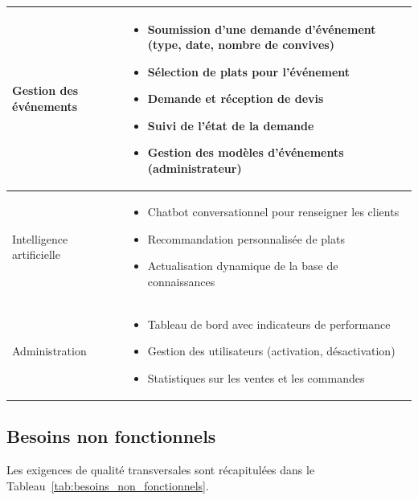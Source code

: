 \begin{longtable}{|p{3.5cm}|p{9cm}|}
    Gestion des événements &
    \begin{itemize}
        \item Soumission d'une demande d'événement (type, date, nombre de convives)
        \item Sélection de plats pour l'événement
        \item Demande et réception de devis
        \item Suivi de l'état de la demande
        \item Gestion des modèles d'événements (administrateur)
    \end{itemize} \\
    \hline

    Intelligence artificielle &
    \begin{itemize}
        \item Chatbot conversationnel pour renseigner les clients
        \item Recommandation personnalisée de plats
        \item Actualisation dynamique de la base de connaissances
    \end{itemize} \\
    \hline

    Administration &
    \begin{itemize}
        \item Tableau de bord avec indicateurs de performance
        \item Gestion des utilisateurs (activation, désactivation)
        \item Statistiques sur les ventes et les commandes
    \end{itemize} \\
    \hline
\end{longtable}

\subsection{Besoins non fonctionnels}

Les exigences de qualité transversales sont récapitulées dans le Tableau~\ref{tab:besoins_non_fonctionnels}.

